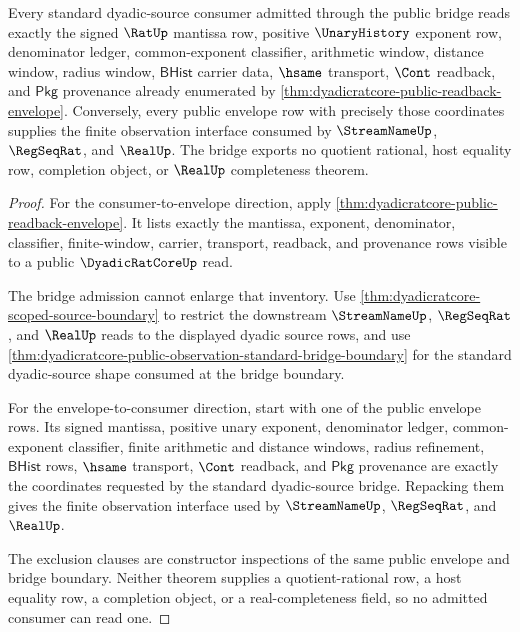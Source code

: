 \begin{theorem}
\label{thm:dyadicratcore-public-bridge-consumer-exactness}
Every standard dyadic-source consumer admitted through the public bridge reads
exactly the signed $\RatUp$ mantissa row, positive $\UnaryHistory$ exponent
row, denominator ledger, common-exponent classifier, arithmetic window,
distance window, radius window, $\mathsf{BHist}$ carrier data, $\hsame$
transport, $\Cont$ readback, and $\mathsf{Pkg}$ provenance already enumerated
by \autoref{thm:dyadicratcore-public-readback-envelope}. Conversely, every
public envelope row with precisely those coordinates supplies the finite
observation interface consumed by $\StreamNameUp$, $\RegSeqRat$, and $\RealUp$.
The bridge exports no quotient rational, host equality row, completion object,
or $\RealUp$ completeness theorem.
\end{theorem}
\begin{proof}
For the consumer-to-envelope direction, apply
\autoref{thm:dyadicratcore-public-readback-envelope}. It lists exactly the
mantissa, exponent, denominator, classifier, finite-window, carrier,
transport, readback, and provenance rows visible to a public
$\DyadicRatCoreUp$ read.

The bridge admission cannot enlarge that inventory. Use
\autoref{thm:dyadicratcore-scoped-source-boundary} to restrict the downstream
$\StreamNameUp$, $\RegSeqRat$, and $\RealUp$ reads to the displayed dyadic
source rows, and use
\autoref{thm:dyadicratcore-public-observation-standard-bridge-boundary} for the
standard dyadic-source shape consumed at the bridge boundary.

For the envelope-to-consumer direction, start with one of the public envelope
rows. Its signed mantissa, positive unary exponent, denominator ledger,
common-exponent classifier, finite arithmetic and distance windows, radius
refinement, $\mathsf{BHist}$ rows, $\hsame$ transport, $\Cont$ readback, and
$\mathsf{Pkg}$ provenance are exactly the coordinates requested by the
standard dyadic-source bridge. Repacking them gives the finite observation
interface used by $\StreamNameUp$, $\RegSeqRat$, and $\RealUp$.

The exclusion clauses are constructor inspections of the same public envelope
and bridge boundary. Neither theorem supplies a quotient-rational row, a host
equality row, a completion object, or a real-completeness field, so no admitted
consumer can read one.
\end{proof}

